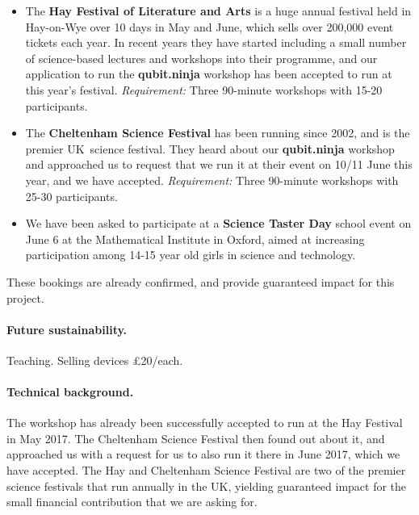 \documentclass[a4paper, 12pt]{article}
\begin{document}
\begin{itemize}
\item The \textbf{Hay Festival of Literature and Arts} is a huge annual festival held in Hay-on-Wye over 10 days in May and June, which sells over 200,000 event tickets each year. In recent years they have started including a small number of science-based lectures and workshops into their programme, and our application to run the \textbf{qubit.ninja} workshop has been accepted to run at  this year's festival. \textit{Requirement:} Three 90-minute workshops with 15-20 participants.

\item The \textbf{Cheltenham Science Festival} has been running since 2002, and is the premier UK\ science festival. They heard about our \textbf{qubit.ninja} workshop and approached us to request that we run it at their event on 10/11 June this year, and we have accepted. \textit{Requirement:} Three 90-minute workshops with 25-30 participants.

\item We have been asked to participate at a \textbf{Science Taster Day} school event on June 6 at the Mathematical Institute in Oxford, aimed at increasing participation among 14-15 year old girls in science and technology. 
\end{itemize}
These bookings are already confirmed, and provide guaranteed impact for this project.

\paragraph{Future sustainability.}

Teaching. Selling devices \pounds 20/each.

\paragraph{Technical background.}



 

The workshop has already been successfully accepted to run  at the Hay Festival in May 2017. The Cheltenham Science Festival then found out about it, and approached us with a request for us to also run it there in June 2017, which we have accepted. The Hay and Cheltenham Science Festival are two of the premier science festivals that run annually in the UK, yielding guaranteed impact for the small financial contribution that we are asking for.
\end{document}
